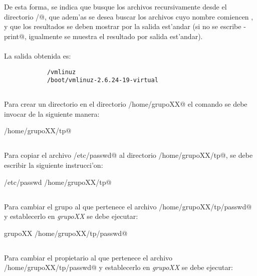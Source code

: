 			De esta forma, se indica que busque los archivos recursivamente desde el directorio \verb@/@, que adem'as se desea buscar los archivos cuyo nombre comiencen \verb@vmlinuz@, y que los resultados se deben mostrar por la salida est'andar (si no se escribe \verb@-print@, igualmente se muestra el resultado por salida est'andar).
			\\\\
			La salida obtenida es:\\

      \begin{mylisting}
      \begin{verbatim} 
			/vmlinuz
			/boot/vmlinuz-2.6.24-19-virtual
      \end{verbatim}
      \end{mylisting}

		\subsection{}
			Para crear un directorio en el directorio \verb@/home/grupoXX@ el comando se debe invocar de la siguiente manera:

			\verb@mkdir /home/grupoXX/tp@

		\subsection{}
		
			Para copiar el archivo \verb@/etc/passwd@ al directorio \verb@/home/grupoXX/tp@, se debe escribir la siguiente instrucci'on:

			\verb@cp /etc/passwd /home/grupoXX/tp@
		
		\subsection{}

			Para cambiar el grupo al que pertenece el archivo \verb@/home/grupoXX/tp/passwd@ y establecerlo en \emph{grupoXX} se debe ejecutar:

			\verb@chgrp grupoXX /home/grupoXX/tp/passwd@

		\subsection{}

			Para cambiar el propietario al que pertenece el archivo \verb@/home/grupoXX/tp/passwd@ y establecerlo en \emph{grupoXX} se debe ejecutar:

